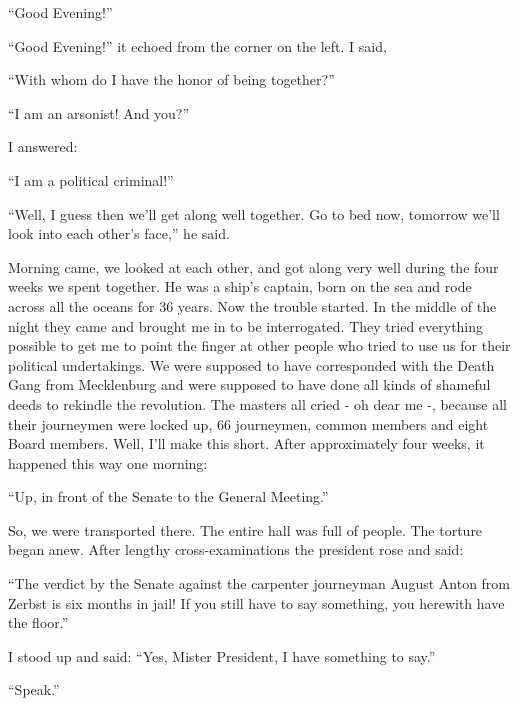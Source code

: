 ``Good Evening!''

``Good Evening!'' it echoed from the corner on the left. I said,

``With whom do I have the honor of being together?''

``I am an arsonist! And you?''

I answered:

``I am a political criminal!''

``Well, I guess then we'll get along well together. Go to bed now, tomorrow we'll look into each other's face,'' he said.

Morning came, we looked at each other, and got along very well during the four weeks we spent together. He was a ship's captain, born on the sea and rode across all the oceans for 36 years. Now the trouble started. In the middle of the night they came and brought me in to be interrogated. They tried everything possible to get me to point the finger at other people who tried to use us for their political undertakings. We were supposed to have corresponded with the Death Gang from Mecklenburg and were supposed to have done all kinds of shameful deeds to rekindle the revolution. The masters all cried - oh dear me -, because all their journeymen were locked up, 66 journeymen, common members and eight Board members. Well, I'll make this short. After approximately four weeks, it happened this way one morning:

``Up, in front of the Senate to the General Meeting.''

So, we were transported there. The entire hall was full of people. The torture began anew. After lengthy cross-examinations the president rose and said:

``The verdict by the Senate against the carpenter journeyman August Anton from Zerbst is six months in jail! If you still have to say something, you herewith have the floor.''

I stood up and said: ``Yes, Mister President, I have something to say.''

``Speak.''

